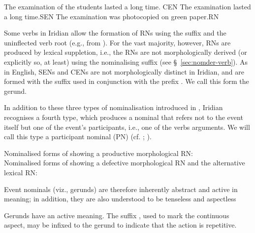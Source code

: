 \pex[interpartskip=0pt]
	\a The examination of the students lasted a long time. \hfill {CEN}
	\a The examination lasted a long time.\hfill {SEN}
	\a The examination was photocopied on green paper.\hfill {RN}\\
\xe

Some verbs in Iridian allow the formation of RNs using the suffix  and the uninflected verb root (e.g.,  from ). For the vast majority, however, RNs are produced by lexical suppletion, i.e., the RNs are not morphologically derived (or explicitly so, at least) using the nominalising suffix (see \S~\ref{sec:nomder-verb}). As in English, SENs and CENs are not morphologically distinct in Iridian, and are formed with the suffix  used in conjunction with the prefix . We call this form the {\cscaps gerund}.

In addition to these three types of nominalisation introduced in \textcite{grimshaw1990}, Iridian recognises a fourth type, which produces a nominal that refers not to the event itself but one of the event's participants, i.e., one of the verbs arguments. We will call this type a {\cscaps participant nominal} (PN) (cf. \cite[400-5]{schackow2015}; \cite[297-8]{okuna}).

\pex \a Nominalised forms of  showing a productive morphological RN:\smallskip\\
\a Nominalised forms of  showing a defective morphological RN and the alternative lexical RN:\smallskip\\
	\xe


Event nominals (viz., gerunds) are therefore inherently abstract and active in meaning; in addition, they are also understood to be tenseless and aspectless

Gerunds have an active meaning. The suffix , used to mark the continuous aspect, may be infixed to the gerund to indicate that the action is repetitive.

